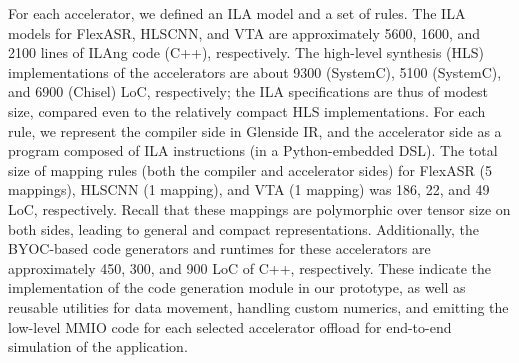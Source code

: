 \begin{enumerate}[leftmargin=*]
\end{enumerate}
%
For each accelerator, we defined an ILA model and a set of \mapping rules.
%
The ILA models for FlexASR, HLSCNN, and VTA are approximately 5600, 1600, and 2100 lines of ILAng code (C++), respectively. 
The high-level synthesis (HLS) implementations
  of the accelerators are about 9300 (SystemC), 5100 (SystemC), and 6900 (Chisel) LoC, %
  respectively;
  the ILA specifications are thus of modest size,
  compared even to the relatively compact HLS implementations. 
%
For each \mapping rule, we represent the compiler side in Glenside IR, and the accelerator side %
as a program composed of ILA instructions (in a Python-embedded DSL). 
The total size of mapping rules (both the compiler and accelerator sides) for FlexASR (5 mappings), HLSCNN (1 mapping), and VTA (1 mapping) was 186, 22, and 49 LoC, respectively.
Recall that these mappings are polymorphic over tensor size on both sides, leading to general and compact representations. 
Additionally, the BYOC-based code generators and runtimes for these accelerators are approximately 450, 300, and 900 LoC of C++, %
respectively. 
These indicate the implementation of the code generation module in our prototype, as well as reusable utilities for data movement, handling custom numerics, and emitting the low-level MMIO code for each selected accelerator offload for end-to-end simulation of the application.

